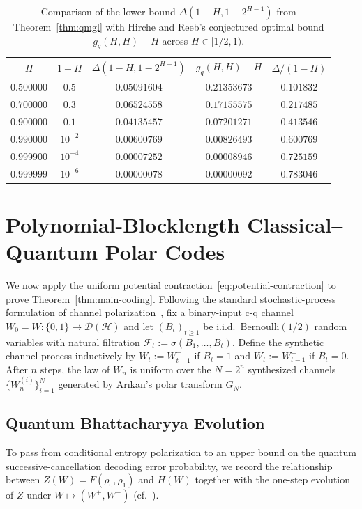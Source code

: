 \documentclass[10pt,a4paper]{article}
\numberwithin{equation}{section}
\theoremstyle{plain}
\theoremstyle{definition}
\theoremstyle{remark}
\newcommand{\cH}{\mathcal{H}}
\newcommand{\cD}{\mathcal{D}}
\newcommand{\cF}{\mathcal{F}}
\begin{document}
\begin{table}[!htbp]
\centering
\begin{tabular}{ccccc}
\toprule
$H$ & $1 - H$ & $\Delta(1 - H, 1 - 2^{H-1})$ & $g_q(H,H) - H$ & $\Delta/(1 - H)$ \\
\midrule
$0.500000$ & $0.5$ & $0.05091604$ & $0.21353673$ & $0.101832$ \\
$0.700000$ & $0.3$ & $0.06524558$ & $0.17155575$ & $0.217485$ \\
$0.900000$ & $0.1$ & $0.04135457$ & $0.07201271$ & $0.413546$ \\
$0.990000$ & $10^{-2}$ & $0.00600769$ & $0.00826493$ & $0.600769$ \\
$0.999900$ & $10^{-4}$ & $0.00007252$ & $0.00008946$ & $0.725159$ \\
$0.999999$ & $10^{-6}$ & $0.00000078$ & $0.00000092$ & $0.783046$ \\
\bottomrule
\end{tabular}
\caption{Comparison of the lower bound $\Delta(1 - H, 1 - 2^{H-1})$ from Theorem~\ref{thm:qmgl} with Hirche and Reeb's conjectured optimal bound $g_q(H,H) - H$ across $H \in [1/2, 1)$.}
\label{tab:comparison}
\end{table}

\section{Polynomial-Blocklength Classical--Quantum Polar Codes}\label{sec:polar-codes}

We now apply the uniform potential contraction~\eqref{eq:potential-contraction} to prove Theorem~\ref{thm:main-coding}. Following the standard stochastic-process formulation of channel polarization~\cite{Arikan2009,WildeGuha2013,GuruswamiXia2015}, fix a binary-input c-q channel $W_0 = W : \{0,1\} \to \cD(\cH)$ and let $(B_t)_{t \ge 1}$ be i.i.d.\ $\mathrm{Bernoulli}(1/2)$ random variables with natural filtration $\cF_t := \sigma(B_1, \ldots, B_t)$. Define the synthetic channel process inductively by $W_t := W_{t-1}^+$ if $B_t = 1$ and $W_t := W_{t-1}^-$ if $B_t = 0$. After $n$ steps, the law of $W_n$ is uniform over the $N = 2^n$ synthesized channels $\{W_n^{(i)}\}_{i=1}^{N}$ generated by Ar{\i}kan's polar transform $G_N$.

\subsection{Quantum Bhattacharyya Evolution}

To pass from conditional entropy polarization to an upper bound on the quantum successive-cancellation decoding error probability, we record the relationship between $Z(W) = F(\rho_0, \rho_1)$ and $H(W)$ together with the one-step evolution of $Z$ under $W \mapsto (W^+, W^-)$ (cf.~\cite[Proposition~5]{WildeGuha2013}).
\end{document}
